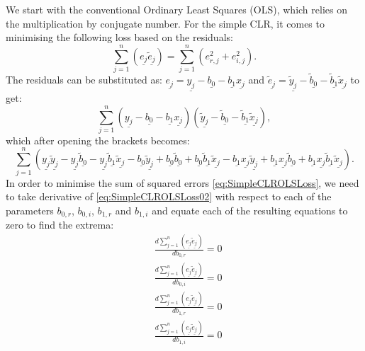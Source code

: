 \documentclass[
]{book}
\begin{document}
We start with the conventional Ordinary Least Squares (OLS), which relies on the multiplication by conjugate number. For the simple CLR, it comes to minimising the following loss based on the residuals:
\begin{equation}
    \sum_{j=1}^n (\underline{e_j} \underline{\tilde{e}_j}) = \sum_{j=1}^n (e_{r,j}^2 + e_{i,j}^2).
    \label{eq:SimpleCLROLSLoss}
\end{equation}
The residuals can be substituted as: \(\underline{e_j} = \underline{y_j} - \underline{b_0} - \underline{b_1} \underline{x_j}\) and \(\underline{\tilde{e}_j} = \underline{\tilde{y}_j} - \underline{\tilde{b}_0} - \underline{\tilde{b}_1} \underline{\tilde{x}_j}\) to get:
\begin{equation}
    \sum_{j=1}^n (\underline{y_j} - \underline{b_0} - \underline{b_1} \underline{x_j}) (\underline{\tilde{y}_j} - \underline{\tilde{b}_0} - \underline{\tilde{b}_1} \underline{\tilde{x}_j}),
    \label{eq:SimpleCLROLSLoss01}
\end{equation}
which after opening the brackets becomes:
\begin{equation}
    \sum_{j=1}^n \left(\underline{y_j} \underline{\tilde{y}_j} - \underline{y_j} \underline{\tilde{b}_0} - \underline{y_j} \underline{\tilde{b}_1} \underline{\tilde{x}_j} - \underline{b_0}\underline{\tilde{y}_j} + \underline{b_0} \underline{\tilde{b}_0} + \underline{b_0} \underline{\tilde{b}_1} \underline{\tilde{x}_j} - \underline{b_1} \underline{x_j} \underline{\tilde{y}_j} + \underline{b_1} \underline{x_j} \underline{\tilde{b}_0} + \underline{b_1} \underline{x_j} \underline{\tilde{b}_1} \underline{\tilde{x}_j} \right) .
    \label{eq:SimpleCLROLSLoss02}
\end{equation}
In order to minimise the sum of squared errors \eqref{eq:SimpleCLROLSLoss}, we need to take derivative of \eqref{eq:SimpleCLROLSLoss02} with respect to each of the parameters \(b_{0,r}\), \(b_{0,i}\), \(b_{1,r}\) and \(b_{1,i}\) and equate each of the resulting equations to zero to find the extrema:
\begin{equation}
    \begin{aligned}
        & \frac{d \sum_{j=1}^n (\underline{e_j} \underline{\tilde{e}_j})}{d b_{0,r}} = 0 \\
        & \frac{d \sum_{j=1}^n (\underline{e_j} \underline{\tilde{e}_j})}{d b_{0,i}} = 0 \\
        & \frac{d \sum_{j=1}^n (\underline{e_j} \underline{\tilde{e}_j})}{d b_{1,r}} = 0 \\
        & \frac{d \sum_{j=1}^n (\underline{e_j} \underline{\tilde{e}_j})}{d b_{1,i}} = 0
    \end{aligned}
    \label{eq:SimpleCLROLSLossSystem01}
\end{equation}
\end{document}

